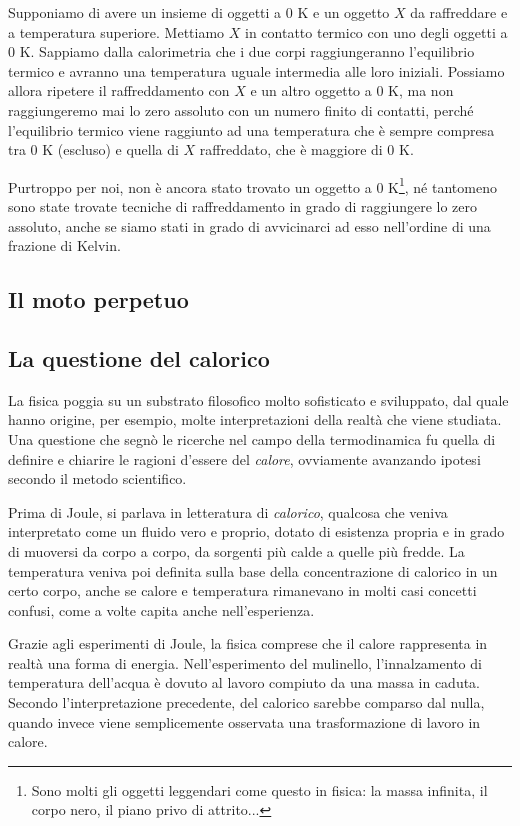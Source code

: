Supponiamo di avere un insieme di oggetti a 0 K e un oggetto $X$ da
raffreddare e a temperatura superiore. Mettiamo $X$ in
contatto termico con uno degli oggetti a 0 K. Sappiamo dalla calorimetria
che i due corpi raggiungeranno l'equilibrio termico e avranno una
temperatura uguale intermedia alle loro iniziali. Possiamo allora
ripetere il raffreddamento con $X$ e un altro oggetto a 0 K, ma
non raggiungeremo mai lo zero assoluto con un numero finito di
contatti, perché l'equilibrio termico viene raggiunto ad una temperatura
che è sempre compresa tra 0 K (escluso) e quella di $X$ raffreddato, che
è maggiore di 0 K.

Purtroppo per noi, non è ancora stato trovato un oggetto a 0 K\footnote{Sono
molti gli oggetti leggendari come questo in fisica: la massa infinita, il
corpo nero, il piano privo di attrito...}, né tantomeno sono state
trovate tecniche di raffreddamento in grado di raggiungere lo zero
assoluto, anche se siamo stati in grado di avvicinarci ad esso
nell'ordine di una frazione di Kelvin.

\subsection{Il moto perpetuo}


\subsection{La questione del calorico}
La fisica poggia su un substrato filosofico molto sofisticato e
sviluppato, dal quale hanno origine, per esempio, molte interpretazioni
della realtà che viene studiata. Una questione che segnò le ricerche
nel campo della termodinamica fu quella di definire e chiarire le
ragioni d'essere del \textit{calore}, ovviamente avanzando ipotesi
secondo il metodo scientifico.

Prima di Joule, si parlava in letteratura di \textit{calorico},
qualcosa che veniva interpretato come un fluido vero e proprio,
dotato di esistenza propria e in grado di muoversi da corpo a
corpo, da sorgenti più calde a quelle più fredde. La temperatura
veniva poi definita sulla base della concentrazione di calorico
in un certo corpo, anche se calore e temperatura rimanevano in
molti casi concetti confusi, come a volte capita anche nell'esperienza.

Grazie agli esperimenti di Joule, la fisica comprese che il calore
rappresenta in realtà una forma di energia. Nell'esperimento del
mulinello, l'innalzamento di temperatura dell'acqua è dovuto al
lavoro compiuto da una massa in caduta. Secondo l'interpretazione
precedente, del calorico sarebbe comparso dal nulla, quando invece
viene semplicemente osservata una trasformazione di lavoro in calore.